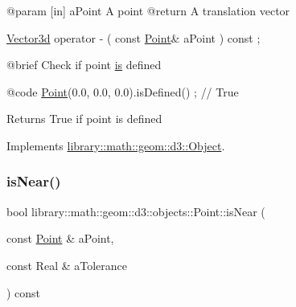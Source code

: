 \begin{DoxyCode}
    @param              [in] aPoint A point
    @\textcolor{keywordflow}{return}             A translation vector

\hyperlink{namespacelibrary_1_1math_1_1obj_a977e84e9bf317a4e7dd9d6d671d6da2f}{Vector3d}                operator -                                  (   \textcolor{keyword}{const}   
      \hyperlink{classlibrary_1_1math_1_1geom_1_1d3_1_1objects_1_1_point_a617e690ab6091af3de729cee337e309e}{Point}&                      aPoint                                      ) \textcolor{keyword}{const} ;

    @brief              Check \textcolor{keywordflow}{if} point \hyperlink{classlibrary_1_1math_1_1geom_1_1d3_1_1_object_a72d75450e5158f602f0847f082606603}{is} defined
   
    @code
                        \hyperlink{classlibrary_1_1math_1_1geom_1_1d3_1_1objects_1_1_point_a617e690ab6091af3de729cee337e309e}{Point}(0.0, 0.0, 0.0).isDefined() ; \textcolor{comment}{// True}
\end{DoxyCode}


\begin{DoxyReturn}{Returns}
True if point is defined 
\end{DoxyReturn}


Implements \hyperlink{classlibrary_1_1math_1_1geom_1_1d3_1_1_object_a2216442e322f0c3ca5f01a4efa22baf7}{library\+::math\+::geom\+::d3\+::\+Object}.

\mbox{\label{classlibrary_1_1math_1_1geom_1_1d3_1_1objects_1_1_point_a0bcdce172502509f9b9d4e5b3fc75a69}} 
\subsubsection{\texorpdfstring{is\+Near()}{isNear()}}
{\footnotesize\ttfamily bool library\+::math\+::geom\+::d3\+::objects\+::\+Point\+::is\+Near (\begin{DoxyParamCaption}\item[{const \hyperlink{classlibrary_1_1math_1_1geom_1_1d3_1_1objects_1_1_point}{Point} \&}]{a\+Point,  }\item[{const Real \&}]{a\+Tolerance }\end{DoxyParamCaption}) const}



